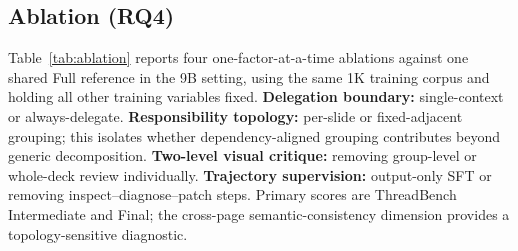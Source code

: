 \subsection{Ablation (RQ4)}

Table~\ref{tab:ablation} reports four one-factor-at-a-time ablations against one shared Full reference in the 9B setting, using the same 1K training corpus and holding all other training variables fixed. \textbf{Delegation boundary:} single-context or always-delegate. \textbf{Responsibility topology:} per-slide or fixed-adjacent grouping; this isolates whether dependency-aligned grouping contributes beyond generic decomposition. \textbf{Two-level visual critique:} removing group-level or whole-deck review individually. \textbf{Trajectory supervision:} output-only SFT or removing inspect--diagnose--patch steps. Primary scores are ThreadBench Intermediate and Final; the cross-page semantic-consistency dimension provides a topology-sensitive diagnostic.

